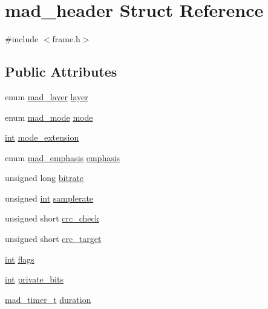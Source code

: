 \hypertarget{structmad__header}{}\section{mad\+\_\+header Struct Reference}
\label{structmad__header}


{\ttfamily \#include $<$frame.\+h$>$}

\subsection*{Public Attributes}
\begin{DoxyCompactItemize}
\item 
enum \hyperlink{libmad_2frame_8h_abbd9de27e20bcf285c28ee515548d650}{mad\+\_\+layer} \hyperlink{structmad__header_a69ea17540b7b9292a37b8dd86b9d7787}{layer}
\item 
enum \hyperlink{libmad_2frame_8h_a8ea365ef0335b4cb80e1cc78bb00c611}{mad\+\_\+mode} \hyperlink{structmad__header_a766a554a9ab575209f4bbd595e4f942c}{mode}
\item 
\hyperlink{xmltok_8h_a5a0d4a5641ce434f1d23533f2b2e6653}{int} \hyperlink{structmad__header_a1ba44705779d2ce1160f092cd3d2a158}{mode\+\_\+extension}
\item 
enum \hyperlink{libmad_2frame_8h_a5c0ea84f562e9b8a2ba78bb32dba48d8}{mad\+\_\+emphasis} \hyperlink{structmad__header_a355a4e10075f8304c7533998bef268a2}{emphasis}
\item 
unsigned long \hyperlink{structmad__header_aa26b0a9c946065e7b39df10c4e8f3995}{bitrate}
\item 
unsigned \hyperlink{xmltok_8h_a5a0d4a5641ce434f1d23533f2b2e6653}{int} \hyperlink{structmad__header_ac6ca4dc0cbab5c4a7014bb8c26b9d06e}{samplerate}
\item 
unsigned short \hyperlink{structmad__header_a8ea6796703f278702c76098af6ccd762}{crc\+\_\+check}
\item 
unsigned short \hyperlink{structmad__header_a56c1726d166d76d55ee09fb681f1ace9}{crc\+\_\+target}
\item 
\hyperlink{xmltok_8h_a5a0d4a5641ce434f1d23533f2b2e6653}{int} \hyperlink{structmad__header_ac7b0399dfabb2192aa1ed7ef07a7c7a7}{flags}
\item 
\hyperlink{xmltok_8h_a5a0d4a5641ce434f1d23533f2b2e6653}{int} \hyperlink{structmad__header_a420fd7325353f23c81192a0cc7adbf1b}{private\+\_\+bits}
\item 
\hyperlink{structmad__timer__t}{mad\+\_\+timer\+\_\+t} \hyperlink{structmad__header_a44026fde9a7e3bef31a901c3ae5e1268}{duration}
\end{DoxyCompactItemize}


